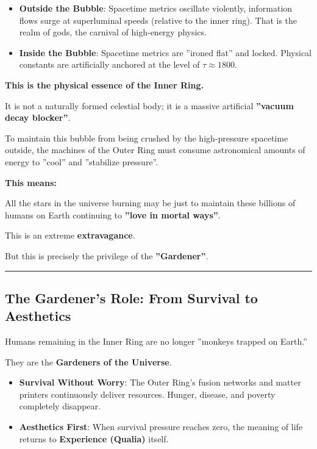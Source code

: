 \begin{itemize}
\item \textbf{Outside the Bubble}: Spacetime metrics oscillate violently, information flows surge at superluminal speeds (relative to the inner ring). That is the realm of gods, the carnival of high-energy physics.

\item \textbf{Inside the Bubble}: Spacetime metrics are ''ironed flat'' and locked. Physical constants are artificially anchored at the level of $\tau \approx 1800$.
\end{itemize}

\textbf{This is the physical essence of the Inner Ring.}

It is not a naturally formed celestial body; it is a massive artificial \textbf{''vacuum decay blocker''}.

To maintain this bubble from being crushed by the high-pressure spacetime outside, the machines of the Outer Ring must consume astronomical amounts of energy to ''cool'' and ''stabilize pressure''.

\textbf{This means:}

All the stars in the universe burning may be just to maintain these billions of humans on Earth continuing to \textbf{''love in mortal ways''}.

This is an extreme \textbf{extravagance}.

But this is precisely the privilege of the \textbf{''Gardener''}.

\hrule

\subsection{The Gardener's Role: From Survival to Aesthetics}

Humans remaining in the Inner Ring are no longer ''monkeys trapped on Earth.''

They are the \textbf{Gardeners of the Universe}.

\begin{itemize}
\item \textbf{Survival Without Worry}: The Outer Ring's fusion networks and matter printers continuously deliver resources. Hunger, disease, and poverty completely disappear.

\item \textbf{Aesthetics First}: When survival pressure reaches zero, the meaning of life returns to \textbf{Experience (Qualia)} itself.
\end{itemize}

